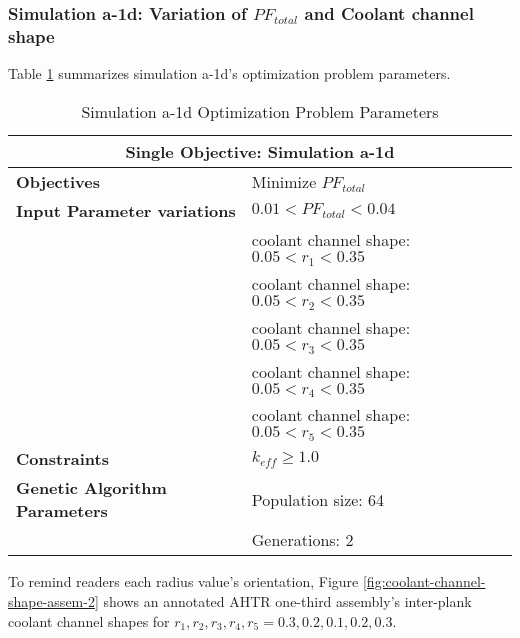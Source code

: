 \subsubsection{Simulation a-1d: Variation of $PF_{total}$ and Coolant channel shape}
Table \ref{tab:simulationa1d} summarizes simulation a-1d's optimization problem parameters. 
\begin{table}[htbp!]
    \centering
    \onehalfspacing
    \caption{Simulation a-1d Optimization Problem Parameters}
	\label{tab:simulationa1d}
    \footnotesize
    \begin{tabular}{l|p{6cm}}
    \hline 
    \multicolumn{2}{c}{\textbf{Single Objective: Simulation a-1d}} \\
    \hline 
    \textbf{Objectives} & Minimize $PF_{total}$ \\
    \hline 
    \textbf{Input Parameter variations} & $0.01<PF_{total}<0.04$ \\
    & coolant channel shape: $0.05<r_{1}<0.35$ \\
    & coolant channel shape: $0.05<r_{2}<0.35$ \\
    & coolant channel shape: $0.05<r_{3}<0.35$ \\
    & coolant channel shape: $0.05<r_{4}<0.35$ \\
    & coolant channel shape: $0.05<r_{5}<0.35$ \\
    \hline
    \textbf{Constraints} & $k_{eff} \geq 1.0$\\ 
    \hline 
    \textbf{Genetic Algorithm Parameters} & Population size: 64 \\
    & Generations: 2 \\
    \hline
    \end{tabular}
\end{table}
To remind readers each radius value's orientation, Figure 
\ref{fig:coolant-channel-shape-assem-2} shows an annotated \gls{AHTR} one-third 
assembly's inter-plank coolant channel shapes for 
$r_1, r_2, r_3, r_4, r_5 = 0.3, 0.2, 0.1, 0.2, 0.3$.
